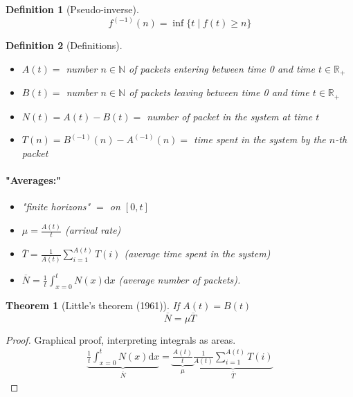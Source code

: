 \documentclass{article}
\newcommand{\deriv}{\mathrm{d}}
\newtheorem{thm}{Theorem}
\newtheorem{defi}{Definition}
\begin{document}
\begin{defi}[Pseudo-inverse]
\[f^{(-1)}(n)=\inf \{t\;|\; f(t)\geq n \}\]
\end{defi}

\begin{defi}[Definitions]
\begin{itemize}
\item $A(t)=$ number $n\in \mathbb{N}$ of packets entering between time 0 and time $t \in \mathbb{R}_{+}$
\item $B(t)=$  number $n\in \mathbb{N}$ of packets leaving between time 0 and time $t \in \mathbb{R}_{+}$
\item $N(t)=A(t)-B(t)=$ number of packet \emph{in} the system at time $t$
\item $T(n)=B^{(-1)}(n)-A^{(-1)}(n)=$ time spent in the system by the $n$-th packet
\end{itemize}
\paragraph{"Averages:"}
\begin{itemize}
\item "finite horizons" $=$ on $[0,t]$
\item $\mu = \frac{A(t)}{t}$ (arrival rate)
\item $\overline{T}=\frac{1}{A(t)}\sum_{i=1}^{A(t)}T(i)$ (average time spent in the system)
\item $\overline{N}=\frac{1}{t}\int_{x=0}^t N(x) \deriv x$ (average number of packets).
\end{itemize}
\end{defi}


\begin{thm}[Little's theorem (1961)]
If $A(t)=B(t)$
\[\overline{N} = \mu \overline{T}\]
\end{thm}

\begin{proof}
Graphical proof, interpreting integrals as areas.
\begin{align*}
\underbrace{\frac{1}{t}\int_{x=0}^t N(x) \deriv x}_{\overline{N}} = \underbrace{\frac{A(t)}{t}}_{\mu} \underbrace{\frac{1}{A(t)}\sum_{i=1}^{A(t)}T(i)}_{\overline{T}}
\end{align*}
\end{proof}
\end{document}
